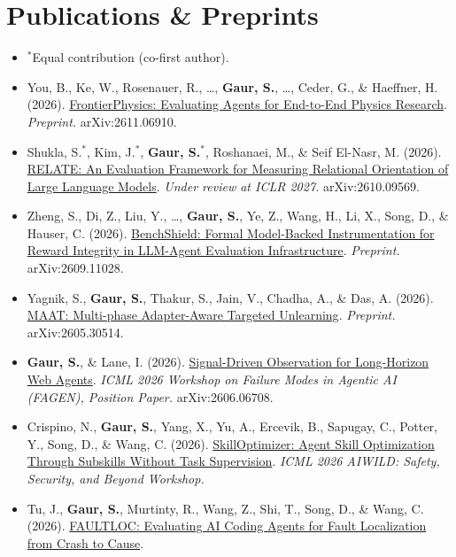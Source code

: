 \documentclass[letterpaper,11pt]{article}
\begin{document}
\section{Publications \& Preprints}
\begin{itemize}[leftmargin=0.25in, labelsep=0.08in]
  \small
  \item[] \footnotesize $^{*}$Equal contribution (co-first author). \vspace{2pt}
  \item[{[1]}] You, B., Ke, W., Rosenauer, R., \ldots, \textbf{Gaur, S.}, \ldots, Ceder, G., \& Haeffner, H. (2026).
  \href{https://arxiv.org/abs/2611.06910}{FrontierPhysics: Evaluating Agents for End-to-End Physics Research}.
  \textit{Preprint.} arXiv:2611.06910.
  \item[{[2]}] Shukla, S.$^{*}$, Kim, J.$^{*}$, \textbf{Gaur, S.}$^{*}$, Roshanaei, M., \& Seif El-Nasr, M. (2026).
  \href{https://arxiv.org/abs/2610.09569}{RELATE: An Evaluation Framework for Measuring Relational Orientation of Large Language Models}.
  \textit{Under review at ICLR 2027.} arXiv:2610.09569.
  \item[{[3]}] Zheng, S., Di, Z., Liu, Y., \ldots, \textbf{Gaur, S.}, Ye, Z., Wang, H., Li, X., Song, D., \& Hauser, C. (2026).
  \href{https://arxiv.org/abs/2609.11028}{BenchShield: Formal Model-Backed Instrumentation for Reward Integrity in LLM-Agent Evaluation Infrastructure}.
  \textit{Preprint.} arXiv:2609.11028.
  \item[{[4]}] Yagnik, S., \textbf{Gaur, S.}, Thakur, S., Jain, V., Chadha, A., \& Das, A. (2026).
  \href{https://arxiv.org/abs/2605.30514}{MAAT: Multi-phase Adapter-Aware Targeted Unlearning}.
  \textit{Preprint.} arXiv:2605.30514.
  \item[{[5]}] \textbf{Gaur, S.}, \& Lane, I. (2026).
  \href{https://arxiv.org/abs/2606.06708}{Signal-Driven Observation for Long-Horizon Web Agents}.
  \textit{ICML 2026 Workshop on Failure Modes in Agentic AI (FAGEN), Position Paper.} arXiv:2606.06708.
  \item[{[6]}] Crispino, N., \textbf{Gaur, S.}, Yang, X., Yu, A., Ercevik, B., Sapugay, C., Potter, Y., Song, D., \& Wang, C. (2026).
  \href{https://openreview.net/forum?id=nZYF0aPAMP}{SkillOptimizer: Agent Skill Optimization Through Subskills Without Task Supervision}.
  \textit{ICML 2026 AIWILD: Safety, Security, and Beyond Workshop.}
  \item[{[7]}] Tu, J., \textbf{Gaur, S.}, Murtinty, R., Wang, Z., Shi, T., Song, D., \& Wang, C. (2026).
  \href{https://openreview.net/forum?id=3q6yWfaQ8R}{FAULTLOC: Evaluating AI Coding Agents for Fault Localization from Crash to Cause}.

\end{itemize}
\end{document}

